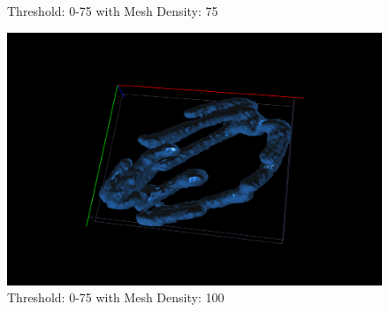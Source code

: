 \documentclass{article}
\begin{document}
\begin{figure}[h!]
\begin{minipage}[b]{0.5\linewidth}
    \captionsetup{width=.8\linewidth}
    \caption{Threshold: 0-75 with Mesh Density: 75}
    \label{fig:075_75}
    \vspace{4ex}
  \end{minipage}%
  \begin{minipage}[b]{0.5\linewidth}
    \centering
    \includegraphics[width=.8\linewidth]{Report/Images/6.3.2/0-75,100.png}
    \captionsetup{width=.8\linewidth}
    \caption{Threshold: 0-75 with Mesh Density: 100}
    \label{fig:075_100}
    \vspace{4ex}
  \end{minipage} 
\end{figure}
\end{document}
